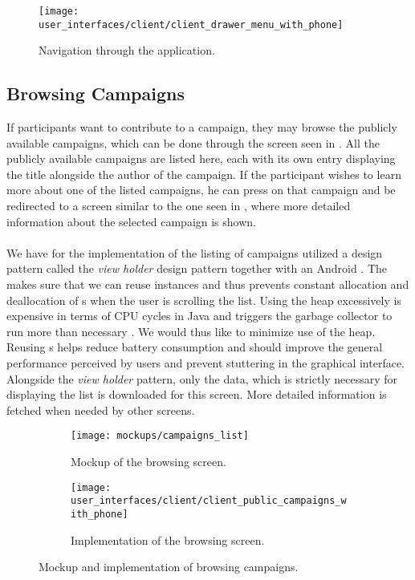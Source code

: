 \begin{figure}[!htbp]
    \centering
    \texttt{[image: user\_interfaces/client/client\_drawer\_menu\_with\_phone]}
    \caption{Navigation through the application.}
    \label{fig:navigation}
\end{figure}
\FloatBarrier

\subsection{Browsing Campaigns}
\label{sub:browsing_campaigns}



 If participants want to contribute to a campaign, they may browse the publicly available campaigns, which can be done through the screen seen in . All the publicly available campaigns are listed here, each with its own entry displaying the title alongside the author of the campaign. If the participant wishes to learn more about one of the listed campaigns, he can press on that campaign and be redirected to a screen similar to the one seen in , where more detailed information about the selected campaign is shown. 
\\\\
We have for the implementation of the listing of campaigns utilized a design pattern called the \emph{view holder} design pattern \parencite{view_holder_pattern} together with an Android . The  makes sure that we can reuse  instances and thus prevents constant allocation and deallocation of s when the user is scrolling the list. Using the heap excessively is expensive in terms of CPU cycles in Java and triggers the garbage collector to run more than necessary \parencite{android_garbage_collection}. We would thus like to minimize use of the heap. Reusing s helps reduce battery consumption and should improve the general performance perceived by users and prevent stuttering in the graphical interface. Alongside the \emph{view holder} pattern, only the data, which is strictly necessary for displaying the list is downloaded for this screen. More detailed information is fetched when needed by other screens.

\begin{figure}[!htbp]
    \begin{subfigure}[!t]{.48\textwidth}
        \centering
        \texttt{[image: mockups/campaigns\_list]}
        \caption{Mockup of the browsing screen.}
        \label{fig:mockup_public_campaigns}
    \end{subfigure}%
    \begin{subfigure}[!t]{.52\textwidth}
        \centering
        \texttt{[image: user\_interfaces/client/client\_public\_campaigns\_with\_phone]}
        \caption{Implementation of the browsing screen.}
        \label{fig:implementation_public_campaigns}
    \end{subfigure}
    \caption{Mockup and implementation of browsing campaigns.}
    \label{fig:public_campaigns}
\end{figure}
\FloatBarrier

